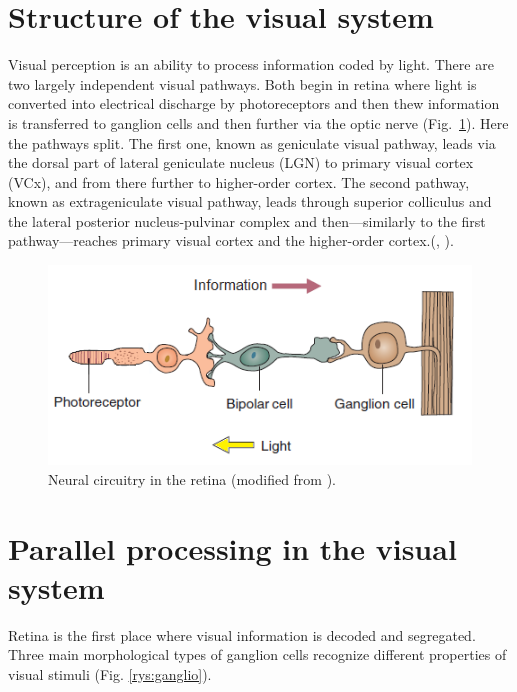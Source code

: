\documentclass{pracalicmgr}
\begin{document}
    \section{Structure of the visual system}
    Visual perception is an ability to process information coded by light. There are two largely independent visual pathways. Both begin in retina where light is converted into electrical discharge by photoreceptors and then thew information is transferred to ganglion cells and then further via the optic nerve (Fig.~\ref{rys:neural_circuitry}). Here the pathways split. The first one, known as geniculate visual pathway, leads via the dorsal part of lateral geniculate nucleus (LGN) to primary visual cortex (VCx), and from there further to higher-order cortex. The second pathway, known as extrageniculate visual pathway, leads through superior colliculus and the lateral posterior nucleus-pulvinar complex and then---similarly to the first pathway---reaches primary visual cortex and the higher-order cortex.(\cite{viola}, \cite{thomsonlayer6}). 
    \begin{figure}[htbp]
    	\begin{center}
    		\includegraphics[scale=0.9]{neural_circuitry.png}
    	\end{center}
    	\caption{Neural circuitry in the retina (modified from \cite{carlsonphysiology}).}
    	\label{rys:neural_circuitry}
    \end{figure}      

   \section{Parallel processing in the visual system}
    Retina is the first place where visual information is decoded and segregated. Three main morphological types of ganglion cells recognize different properties of visual stimuli (Fig. \ref{rys:ganglio}).
\end{document}
